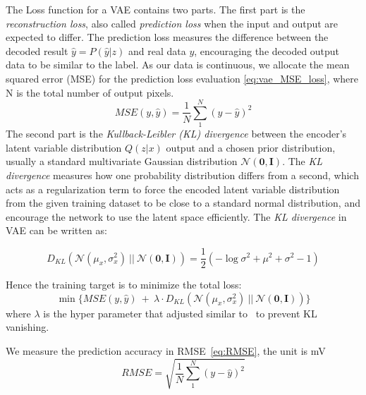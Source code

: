The Loss function for a VAE contains two parts. The first part is the \textit{reconstruction loss}, also called \textit{prediction loss} when the input and output are expected to differ. The prediction loss measures the difference between the decoded result $\hat{y} = P(\hat{y}|z)$ and real data $y$, encouraging the decoded output data to be similar to the label. As our data is continuous, we allocate the mean squared error (MSE) for the prediction loss evaluation \eqref{eq:vae_MSE_loss}, where N is the total number of output pixels.
\begin{equation}
	\label{eq:vae_MSE_loss}
	\textit{MSE}(y, \hat{y}) = \frac{1}{N} \sum_{1}^{N} ( y - \hat{y})^{2}
\end{equation}
The second part is the \textit{Kullback-Leibler (KL) divergence} between the encoder's latent variable distribution $Q(z|x)$ output and a chosen prior distribution, usually a standard multivariate Gaussian distribution $\mathcal{N}(\textbf{0}, \textbf{I})$. The \textit{KL divergence} measures how one probability distribution differs from a second, which acts as a regularization term to force the encoded latent variable distribution from the given training dataset to be close to a standard normal distribution, and encourage the network to use the latent space efficiently. 
The \textit{KL divergence} in VAE can be written as:

\begin{equation}
	\label{eq:vae_KLD_loss}
	D_{KL}( \mathcal{N}(\mu_{x}, \sigma_{x}^{2}) ~ || ~ \mathcal{N}(\textbf{0}, \textbf{I} ) )  = \dfrac{1}{2} (-\log\sigma^{2} + \mu^{2} + \sigma^{2} - 1)
\end{equation}

Hence the training target is to minimize the total loss:
\begin{equation}
	\label{eq:vae_total_loss}
	\min  \{ \textit{MSE} (y, \hat{y})  ~ + ~ \lambda \cdot D_{KL}( \mathcal{N}(\mu_{x}, \sigma_{x}^{2}) ~ || ~ \mathcal{N}(\textbf{0}, \textbf{I} ) )  \}
\end{equation}
where $\lambda$ is the hyper parameter that adjusted similar to~\cite{Fu:arxiv'19} to prevent KL vanishing.

We measure the prediction accuracy in RMSE~\eqref{eq:RMSE}, the unit is mV
\begin{equation}
	\label{eq:RMSE}
	\textit{RMSE} =\sqrt{ \frac{1}{N} \sum_{1}^{N} ( y - \hat{y})^{2} }
\end{equation}






